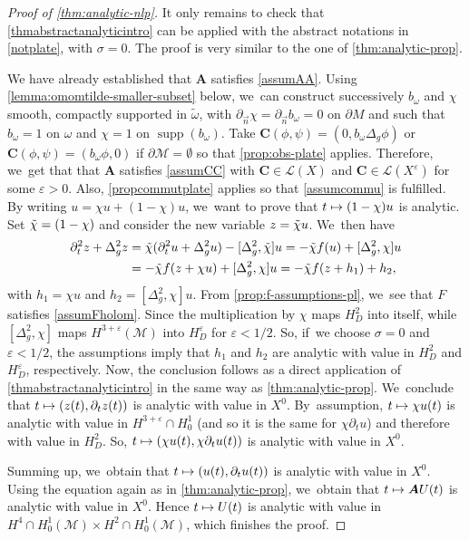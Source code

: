 \documentclass[JEP,XML,SOM,Unicode,published]{cedram}
\newcommand\mto{\mathchoice{\longmapsto}{\mapsto}{\mapsto}{\mapsto}}
\DeclareMathOperator{\supp}{\mathrm{supp}}
\theoremstyle{definition}
\let\mc\mathcal
\let\veps\varepsilon
\newcommand{\M}{\mc{M}}
\newcommand{\bC}{\boldsymbol{C}}
\newcommand{\bA}{\boldsymbol{A}}
\begin{document}
\begin{proof}[Proof of \cref{thm:analytic-nlp}]
It only remains to check that \cref{thmabstractanalyticintro} can be applied with the abstract notations in \cref{notplate}, with $\sigma=0$. The proof is very similar to the one of \cref{thm:analytic-prop}.

We have already established that $\bA$ satisfies \cref{assumAA}. Using \cref{lemma:omomtilde-smaller-subset} below, we~can construct successively $b_{\omega}$ and $\chi$ smooth, compactly supported in $\widetilde{\omega}$, with $\partial_{\vec n}\chi=\partial_{\vec n}b_{\omega}=0$ on $\partial M$ and such that $b_{\omega}=1$ on $\omega$ and $\chi=1$ on $\supp(b_{\omega})$. Take $\bC(\phi, \psi)=(0,b_\omega \Delta_g \phi)$ or $\bC(\phi, \psi)=(b_\omega \phi,0)$ if $\partial \M=\emptyset$ so that \cref{prop:obs-plate} applies. Therefore, we~get that that $\bA$ satisfies \cref{assumCC} with $\bC\in \mc{L}(X)$ and $\bC\in \mc{L}(X^\veps)$ for some $\veps>0$. Also, \cref{propcommutplate} applies so that \cref{assumcommu} is fulfilled.
By writing $u=\chi u+(1-\chi)u$, we~want to prove that $t\mto (1-\chi)u$ is analytic. Set $\Tilde{\chi}=(1-\chi)$ and consider the new variable $z=\Tilde{\chi} u$. We~then have
\begin{align*}
\partial_t^2 z+\Delta_g^2 z &=\Tilde{\chi}(\partial_t^2 u+\Delta_g^2 u)-[\Delta_g^2, \Tilde{\chi}]u=-\Tilde{\chi} f(u)+[\Delta_g^2, \chi]u\\
&=-\Tilde{\chi} f(z+\chi u)+[\Delta_g^2, \chi]u=-\Tilde{\chi} f(z+h_1)+h_2,
\end{align*}
with $h_1=\chi u$ and $h_2=[\Delta_g^2,\chi]u$. From \cref{prop:f-assumptions-pl}, we~see that $F$ satisfies \cref{assumFholom}. Since the multiplication by $\chi$ maps $H^2_D$ into itself, while $[\Delta_g^2,\chi]$ maps $H^{3+\veps}(\M)$ into $H^{\veps}_D$ for $\veps<1/2$. So, if~we choose $\sigma=0$ and $\veps<1/2$, the assumptions imply that $h_1$ and $h_2$ are analytic with value in $H^2_D$ and $H^{\veps}_D$, respectively. Now, the conclusion follows as a direct application of \cref{thmabstractanalyticintro} in the same way as \cref{thm:analytic-prop}. We~conclude that $t\mto (z(t), \partial_t z(t))$ is analytic with value in $X^0$. By~assumption, $t\mto \chi u(t)$ is analytic with value in $H^{3+\veps}\cap H_0^1$ (and so it is the same for $\chi \partial_t u$) and therefore with value in $H^2_D$. So, $t\mto (\chi u(t),\chi\partial_t u(t))$ is analytic with value in $X^0$.

Summing up, we~obtain that $t\mto ( u(t),\partial_t u(t))$ is analytic with value in $X^0$. Using the equation again as in \cref{thm:analytic-prop}, we~obtain that $t\mto \bA U(t)$ is analytic with value in $X^0$. Hence $t\mto U(t)$ is analytic with value in $H^4\cap H_0^1(\M)\times H^2\cap H_0^1(\M)$, which finishes the proof.
\end{proof}
\end{document}
